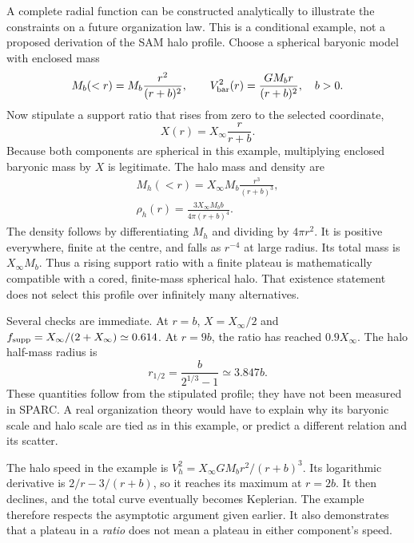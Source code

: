 A complete radial function can be constructed analytically to illustrate the constraints on a future organization law. This is a conditional example, not a proposed derivation of the SAM halo profile. Choose a spherical baryonic model with enclosed mass
\begin{equation}
 M_b(<r)=M_b\frac{r^2}{(r+b)^2},\qquad
 V_{\rm bar}^2(r)=\frac{GM_br}{(r+b)^2},\quad b>0.
 \label{c10:toybaryons}
\end{equation}
Now stipulate a support ratio that rises from zero to the selected coordinate,
\begin{equation}
 X(r)=X_\infty\frac{r}{r+b}.
 \label{c10:toyx}
\end{equation}
Because both components are spherical in this example, multiplying enclosed baryonic mass by $X$ is legitimate. The halo mass and density are
\begin{equation}
 \begin{gathered}
 M_h(<r)=X_\infty M_b\frac{r^3}{(r+b)^3},\\
 \rho_h(r)=\frac{3X_\infty M_bb}{4\pi(r+b)^4}.
 \end{gathered}
 \label{c10:toydensity}
\end{equation}
The density follows by differentiating $M_h$ and dividing by $4\pi r^2$. It is positive everywhere, finite at the centre, and falls as $r^{-4}$ at large radius. Its total mass is $X_\infty M_b$. Thus a rising support ratio with a finite plateau is mathematically compatible with a cored, finite-mass spherical halo. That existence statement does not select this profile over infinitely many alternatives.

Several checks are immediate. At $r=b$, $X=X_\infty/2$ and $f_{\rm supp}=X_\infty/(2+X_\infty)\simeq0.614$. At $r=9b$, the ratio has reached $0.9X_\infty$. The halo half-mass radius is
\begin{equation}
 r_{1/2}=\frac{b}{2^{1/3}-1}\simeq3.847b.
 \label{c10:toyhalf}
\end{equation}
These quantities follow from the stipulated profile; they have not been measured in SPARC. A real organization theory would have to explain why its baryonic scale and halo scale are tied as in this example, or predict a different relation and its scatter.

The halo speed in the example is $V_h^2=X_\infty GM_br^2/(r+b)^3$. Its logarithmic derivative is $2/r-3/(r+b)$, so it reaches its maximum at $r=2b$. It then declines, and the total curve eventually becomes Keplerian. The example therefore respects the asymptotic argument given earlier. It also demonstrates that a plateau in a \emph{ratio} does not mean a plateau in either component's speed.

